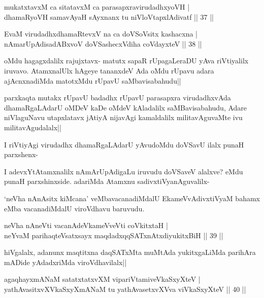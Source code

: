 \begin{shl}
mukatxtavxM ca sitatavxM ca parasapxravirudadhxyoVH |\\
dhamaRyoVH samavAyaH sAyxnanx tu niVloVtapxlAdivatf \hfill || 37 ||
\end{shl}

\begin{shl}
EvaM virudadhxdhamaRtevxV na ca doVSoV\s sitx kashacxna |\\
nAmarUpAdisadABxvoV doVSashecxVdiha coVdayxteV \hfill || 38 ||
\end{shl}

\begin{artha}
oMdu hagagxdalilx rajujxtavx- matutx sapaR rUpagaLeraDU yAva riVtiyalilx iruvavo. AtamxnalUlx hAgeye tananxdeV Ada oMdu rUpavu adara ajAcnxnadiMda matotxMdu rUpavU saMbavisabahudu||

parxkaqta mutakx rUpavU badadhx rUpavU parasapxra virudadhxvAda dhamaRgaLAdarU oMDeV kaDe oMdeV kAladalilx saMBavisabahudu, Adare niVlaguNavu utapxlatavx jAtiyA nijavAgi kamaldalilx militavAguvaMte ivu militavAgudalalx||

I riVtiyAgi virudadhx dhamaRgaLAdarU yAvudoMdu doVSavU ilalx punaH parxshenx-

I adevxYtAtamxnalilx nAmArUpAdigaLu iruvudu doVSaveV alalxve? eMdu punaH parxshinxside. adariMda Atamxnu sadivxtiVyanAguvalilx-
\end{artha}%

\begin{artha}
`neVha nAnAsitx kiMcana' veMbavacanadiMdalU EkameVvAdivxtiVyaM bahamx eMba vacanadiMdalU viroVdhavu baruvudu.
\end{artha}

\begin{shl}
neVha nAneVti vacanAdeVkameVveVti coVkitxtaH |\\
neYvaM parihaqteVsatxsayx maqdadxqqSATxnAtxdiyukitxBiH \hfill || 39 ||
\end{shl}

\begin{artha}
hiVgalalx, adanunx maqtitxna daqSATxMta muMtAda yukitxgaLiMda parihAra mADide yAdadxriMda viroVdhavilalx||
\end{artha}

\begin{shl}
agaqhayxmANaM satatxtatxvXM vipariVtamiveVkaSxyXteV  |\\
yathAvasitxvXVkaSxyXmANaM tu yathAvasetxvXVva viVkaSxyXteV \hfill || 40 ||
\end{shl}


